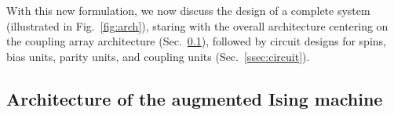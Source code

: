 







With this new formulation,
we now discuss the design of a complete system (illustrated in Fig.~\ref{fig:arch}), 
staring with  the overall architecture centering on the coupling array 
architecture (Sec.~\ref{ssec:arch}), followed by  circuit designs for spins, bias units, 
parity units, and coupling units (Sec.~\ref{ssec:circuit}).

\subsection{Architecture of the augmented Ising machine}
\label{ssec:arch}


